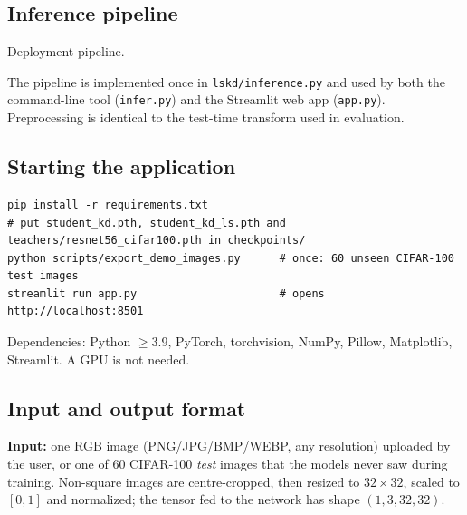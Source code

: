 \documentclass[12pt,a4paper]{article}
\begin{document}
\subsection{Inference pipeline}
\begin{center}

{\small Deployment pipeline.}
\end{center}

The pipeline is implemented once in \texttt{lskd/inference.py} and used by both the command-line tool (\texttt{infer.py}) and the Streamlit web app (\texttt{app.py}). Preprocessing is identical to the test-time transform used in evaluation.

\subsection{Starting the application}
\begin{lstlisting}
pip install -r requirements.txt
# put student_kd.pth, student_kd_ls.pth and teachers/resnet56_cifar100.pth in checkpoints/
python scripts/export_demo_images.py      # once: 60 unseen CIFAR-100 test images
streamlit run app.py                      # opens http://localhost:8501
\end{lstlisting}
Dependencies: Python $\geq$3.9, PyTorch, torchvision, NumPy, Pillow, Matplotlib, Streamlit. A GPU is not needed.

\subsection{Input and output format}
\textbf{Input:} one RGB image (PNG/JPG/BMP/WEBP, any resolution) uploaded by the user, or one of 60 CIFAR-100 \emph{test} images that the models never saw during training. Non-square images are centre-cropped, then resized to $32\times32$, scaled to $[0,1]$ and normalized; the tensor fed to the network has shape $(1,3,32,32)$.
\end{document}
